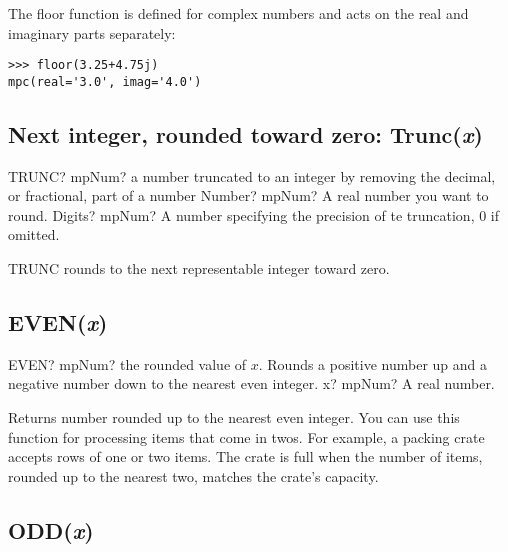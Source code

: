 The floor function is defined for complex numbers and acts on the real and imaginary parts separately:

\begin{lstlisting}
>>> floor(3.25+4.75j)
mpc(real='3.0', imag='4.0')
\end{lstlisting}



\subsection{Next integer, rounded toward zero: Trunc(\textit{x})}


\begin{mpFunctionsExtract}
	\mpWorksheetFunctionTwoNotImplemented
	{TRUNC? mpNum? a number truncated to an integer by removing the decimal, or fractional, part of a number}
	{Number? mpNum? A real number you want to round.}
	{Digits? mpNum? A number specifying the precision of te truncation, 0 if omitted.}
\end{mpFunctionsExtract}

\vspace{0.3cm}

TRUNC rounds to the next representable integer toward zero.




\subsection{EVEN(\textit{x})}

\begin{mpFunctionsExtract}
	\mpWorksheetFunctionOneNotImplemented
	{EVEN? mpNum? the rounded value of $x$. Rounds a positive number up and a negative number down to the nearest even integer.}
	{x? mpNum? A real number.}
\end{mpFunctionsExtract}

\vspace{0.3cm}
Returns number rounded up to the nearest even integer. You can use this function for processing items that come in twos. For example, a packing crate accepts rows of one or two items. The crate is full when the number of items, rounded up to the nearest two, matches the crate's capacity.




\subsection{ODD(\textit{x})}

